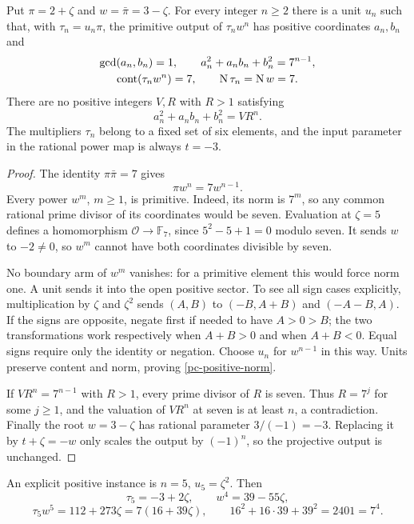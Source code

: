 \begin{theorem}
\label{pc-inverse-boundary}
Put $\pi=2+\zeta$ and $w=\bar\pi=3-\zeta$.
For every integer $n\ge2$ there is a unit $u_n$ such that, with
$\tau_n=u_n\pi$, the primitive output of $\tau_nw^n$ has positive
coordinates $a_n,b_n$ and
\begin{gather}
 \gcd(a_n,b_n)=1,\qquad a_n^2+a_nb_n+b_n^2=7^{n-1},
 \label{pc-positive-norm}\\
 \operatorname{cont}(\tau_nw^n)=7,
 \qquad\operatorname N\tau_n=\operatorname Nw=7.\notag
\end{gather}
There are no positive integers $V,R$ with $R>1$ satisfying
\[
 a_n^2+a_nb_n+b_n^2=VR^n.
\]
The multipliers $\tau_n$ belong to a fixed set of six elements, and
the input parameter in the rational power map is always $t=-3$.
\end{theorem}
\begin{proof}
The identity $\pi\bar\pi=7$ gives
\[
 \pi w^n=7w^{n-1}.
\]
Every power $w^m$, $m\ge1$, is primitive. Indeed, its norm is $7^m$,
so any common rational prime divisor of its coordinates would be seven.
Evaluation at $\zeta=5$ defines a homomorphism
$\mathcal O\to\mathbb F_7$, since $5^2-5+1=0$ modulo seven.
It sends $w$ to $-2\ne0$, so $w^m$ cannot have both coordinates
divisible by seven.

No boundary arm of $w^m$ vanishes: for a primitive element this would
force norm one. A unit sends it into the open positive sector. To see
all sign cases explicitly, multiplication by $\zeta$ and $\zeta^2$
sends $(A,B)$ to $(-B,A+B)$ and $(-A-B,A)$. If the signs are opposite,
negate first if needed to have $A>0>B$; the two transformations work
respectively when $A+B>0$ and when $A+B<0$. Equal signs require only
the identity or negation. Choose $u_n$ for $w^{n-1}$ in this way.
Units preserve content and norm, proving \eqref{pc-positive-norm}.

If $VR^n=7^{n-1}$ with $R>1$, every prime divisor of $R$ is seven.
Thus $R=7^j$ for some $j\ge1$, and the valuation of $VR^n$ at seven
is at least $n$, a contradiction. Finally the root $w=3-\zeta$
has rational parameter $3/(-1)=-3$. Replacing it by $t+\zeta=-w$
only scales the output by $(-1)^n$, so the projective output is unchanged.
\end{proof}

An explicit positive instance is $n=5$, $u_5=\zeta^2$. Then
\[
 \tau_5=-3+2\zeta,\qquad w^4=39-55\zeta,
\]
\[
 \tau_5w^5=112+273\zeta=7(16+39\zeta),\qquad
 16^2+16\cdot39+39^2=2401=7^4.
\]

